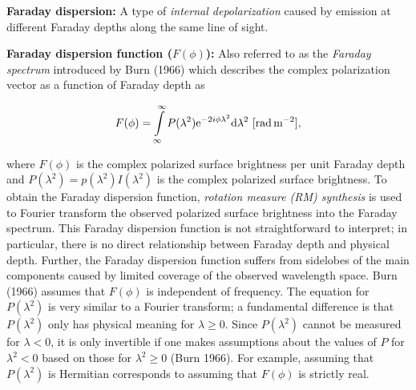 \documentclass[a4paper,10pt]{article}
\begin{document}
{\noindent}\textbf{Faraday dispersion:} A type of \textit{internal depolarization} caused by emission at different Faraday depths along the same line of sight.

{\noindent}\textbf{Faraday dispersion function ($F(\phi)$):} Also referred to as the \textit{Faraday spectrum} introduced by Burn (1966) which describes the complex polarization vector as a function of Faraday depth as

\begin{align*}
    F(\phi) = \int\limits_{\infty}^\infty P(\lambda^2)\mathrm{e}^{-2i\phi\lambda^2}\mathrm{d}\lambda^2 ~ [{\rm rad\,m^{-2}}],
\end{align*}

{\noindent}where $F(\phi)$ is the complex polarized surface brightness per unit Faraday depth and $P(\lambda^2) = p(\lambda^2)I(\lambda^2)$ is the complex polarized surface brightness. To obtain the Faraday dispersion function, \textit{rotation measure (RM) synthesis} is used to Fourier transform the observed polarized surface brightness into the Faraday spectrum. This Faraday dispersion function is not straightforward to interpret; in particular, there is no direct relationship between Faraday depth and physical depth. Further, the Faraday dispersion function suffers from sidelobes of the main components caused by limited coverage of the observed wavelength space. Burn (1966) assumes that $F(\phi)$ is independent of frequency. The equation for $P(\lambda^2)$ is very similar to a Fourier transform; a fundamental difference is that $P(\lambda^2)$ only has physical meaning for $\lambda\geq0$. Since $P(\lambda^2)$ cannot be measured for $\lambda<0$, it is only invertible if one makes assumptions about the values of $P$ for $\lambda^2<0$ based on those for $\lambda^2\geq0$ (Burn 1966). For example, assuming that $P(\lambda^2)$ is Hermitian corresponds to assuming that $F(\phi)$ is strictly real.
\end{document}
